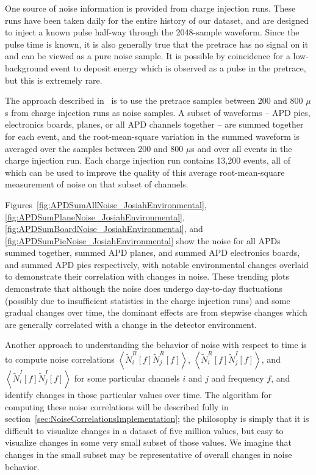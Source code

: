 One source of noise information is provided from charge injection runs.  These runs have been taken daily for the entire history of our dataset, and are designed to inject a known pulse half-way through the 2048-sample waveform.  Since the pulse time is known, it is also generally true that the pretrace has no signal on it and can be viewed as a pure noise sample.  It is possible by coincidence for a low-background event to deposit energy which is observed as a pulse in the pretrace, but this is extremely rare.

The approach described in~\cite{JosiahCoherentAPDNoise} is to use the pretrace samples between 200 and 800 $\mu$s from charge injection runs as noise samples.  A subset of waveforms -- APD pies, electronics boards, planes, or all APD channels together -- are summed together for each event, and the root-mean-square variation in the summed waveform is averaged over the samples between 200 and 800 $\mu$s and over all events in the charge injection run.  Each charge injection run contains 13,200 events, all of which can be used to improve the quality of this average root-mean-square measurement of noise on that subset of channels.

Figures~\ref{fig:APDSumAllNoise_JosiahEnvironmental}, \ref{fig:APDSumPlaneNoise_JosiahEnvironmental}, \ref{fig:APDSumBoardNoise_JosiahEnvironmental}, and \ref{fig:APDSumPieNoise_JosiahEnvironmental} show the noise for all APDs summed together, summed APD planes, and summed APD electronics boards, and summed APD pies respectively, with notable environmental changes overlaid to demonstrate their correlation with changes in noise.  These trending plots demonstrate that although the noise does undergo day-to-day fluctuations (possibly due to insufficient statistics in the charge injection runs) and some gradual changes over time, the dominant effects are from stepwise changes which are generally correlated with a change in the detector environment.

Another approach to understanding the behavior of noise with respect to time is to compute noise correlations $\left<\widetilde{N}^R_i[f]\widetilde{N}^R_j[f]\right>$, $\left<\widetilde{N}^R_i[f]\widetilde{N}^I_j[f]\right>$, and $\left<\widetilde{N}^I_i[f]\widetilde{N}^I_j[f]\right>$ for some particular channels $i$ and $j$ and frequency $f$, and identify changes in those particular values over time.  The algorithm for computing these noise correlations will be described fully in section~\ref{sec:NoiseCorrelationsImplementation}; the philosophy is simply that it is difficult to visualize changes in a dataset of five million values, but easy to visualize changes in some very small subset of those values.  We imagine that changes in the small subset may be representative of overall changes in noise behavior.


